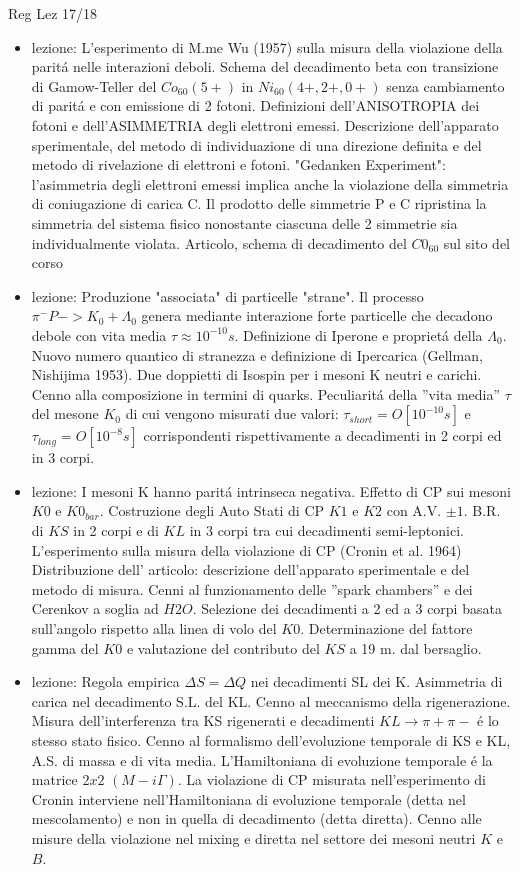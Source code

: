 \begin{frame}[allowframebreaks]{Reg Lez 17/18}
\begin{itemize}
\item lezione: L'esperimento di M.me Wu (1957) sulla misura della violazione della parit\'a nelle interazioni deboli. Schema del decadimento beta con transizione di Gamow-Teller del $Co_{60}(5+)$ in $Ni_{60}(4+,2+,0+)$ senza cambiamento di parit\'a e con emissione di 2 fotoni. Definizioni dell'ANISOTROPIA dei fotoni e dell'ASIMMETRIA degli elettroni emessi. Descrizione dell'apparato sperimentale, del metodo di individuazione di una direzione definita e del metodo di rivelazione di elettroni e fotoni. "Gedanken Experiment": l'asimmetria degli elettroni emessi implica anche la violazione della simmetria di coniugazione di carica C. Il prodotto delle simmetrie P e C ripristina la simmetria del sistema fisico nonostante ciascuna delle 2 simmetrie sia individualmente violata. Articolo, schema di decadimento del $C0_{60}$ sul sito del corso

\item lezione: Produzione "associata" di particelle "strane". Il processo $\pi^- P ->K_0 + \Lambda_0$ genera mediante interazione forte particelle che decadono debole con vita media $\tau\approx 10^{-10} s$. Definizione di Iperone e propriet\'a della $\Lambda_0$. Nuovo numero quantico di stranezza e definizione di Ipercarica (Gellman, Nishijima 1953). Due doppietti di Isospin per i mesoni K neutri e carichi. Cenno alla composizione in termini di quarks. Peculiarit\'a della ''vita media'' $\tau$ del mesone $K_0$ di cui vengono misurati due valori: $\tau_{short}=O[10^{-10}s]$ e $\tau_{long}=O[10^{-8}s]$ corrispondenti rispettivamente a decadimenti in 2 corpi ed in 3 corpi. 

\item lezione: I mesoni K hanno parit\'a intrinseca negativa. Effetto di CP sui mesoni $K0$ e $K0_{bar}$. Costruzione degli Auto Stati di CP $K1$ e $K2$ con A.V. $\pm1$. B.R. di $KS$ in 2 corpi e di $KL$ in 3 corpi tra cui decadimenti semi-leptonici. L'esperimento sulla misura della violazione di CP (Cronin et al. 1964) Distribuzione dell' articolo: descrizione dell'apparato sperimentale e del metodo di misura. Cenni al funzionamento delle ''spark chambers'' e dei Cerenkov a soglia ad $H2O$. Selezione dei decadimenti a 2 ed a 3 corpi basata sull'angolo rispetto alla linea di volo del $K0$. Determinazione del fattore gamma del $K0$ e valutazione del contributo del $KS$ a 19 m. dal bersaglio.

\item lezione: Regola empirica $\Delta S=\Delta Q$ nei decadimenti SL dei K. Asimmetria di carica nel decadimento S.L. del KL. Cenno al meccanismo della rigenerazione. Misura dell'interferenza tra KS rigenerati e decadimenti $KL\to\pi+\pi-$ \'e lo stesso stato fisico. Cenno al formalismo dell'evoluzione temporale di KS e KL, A.S. di massa e di vita media. L'Hamiltoniana di evoluzione temporale \'e la matrice $2x2$ $(M-i\Gamma)$. La violazione di CP misurata nell'esperimento di Cronin interviene nell'Hamiltoniana di evoluzione temporale (detta nel mescolamento) e non in quella di decadimento (detta diretta). Cenno alle misure della violazione nel mixing e diretta nel settore dei mesoni neutri $K$ e $B$. 


\end{itemize}
\end{frame}
